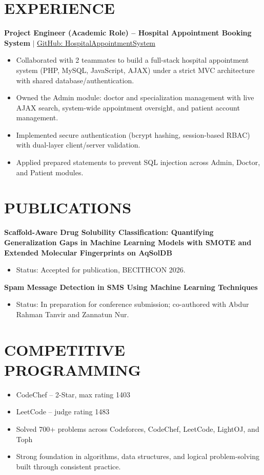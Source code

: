 \documentclass[9.5pt,a4paper]{article}
\begin{document}
\section*{EXPERIENCE}

\textbf{Project Engineer (Academic Role) -- Hospital Appointment Booking System} \quad $|$ \quad \href{https://github.com/Kazi-Sadman/HospitalAppointmentSystem}{GitHub: HospitalAppointmentSystem}
\begin{itemize}
    \item Collaborated with 2 teammates to build a full-stack hospital appointment system (PHP, MySQL, JavaScript, AJAX) under a strict MVC architecture with shared database/authentication.
    \item Owned the Admin module: doctor and specialization management with live AJAX search, system-wide appointment oversight, and patient account management.
    \item Implemented secure authentication (bcrypt hashing, session-based RBAC) with dual-layer client/server validation.
    \item Applied prepared statements to prevent SQL injection across Admin, Doctor, and Patient modules.
\end{itemize}

\section*{PUBLICATIONS}

\textbf{Scaffold-Aware Drug Solubility Classification: Quantifying Generalization Gaps in Machine Learning Models with SMOTE and Extended Molecular Fingerprints on AqSolDB}
\begin{itemize}
    \item Status: Accepted for publication, BECITHCON 2026.
\end{itemize}

\textbf{Spam Message Detection in SMS Using Machine Learning Techniques}
\begin{itemize}
    \item Status: In preparation for conference submission; co-authored with Abdur Rahman Tanvir and Zannatun Nur.
\end{itemize}

\section*{COMPETITIVE PROGRAMMING}
\begin{itemize}
    \item CodeChef -- 2-Star, max rating 1403
    \item LeetCode -- judge rating 1483
    \item Solved 700+ problems across Codeforces, CodeChef, LeetCode, LightOJ, and Toph
    \item Strong foundation in algorithms, data structures, and logical problem-solving built through consistent practice.
\end{itemize}
\end{document}
